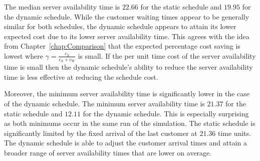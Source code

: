 The median server availability time is $22.66$ for the static schedule and $19.95$ for the dynamic schedule. While the customer waiting times appear to be generally similar for both schedules, the dynamic schedule appears to attain its lower expected cost due to its lower server availability time. This agrees with the idea from Chapter~\ref{chap:Comparison} that the expected percentage cost saving is lowest where $\gamma = \frac{c_{S}}{c_{S} + c_{W}}$ is small. If the per unit time cost of the server availability time is small then the dynamic schedule's ability to reduce the server availability time is less effective at reducing the schedule cost.

Moreover, the minimum server availability time is significantly lower in the case of the dynamic schedule. The minimum server availability time is $21.37$ for the static schedule and $12.11$ for the dynamic schedule. This is especially surprising as both minimums occur in the same run of the simulation. The static schedule is significantly limited by the fixed arrival of the last customer at $21.36$ time units. The dynamic schedule is able to adjust the customer arrival times and attain a broader range of server availability times that are lower on average.